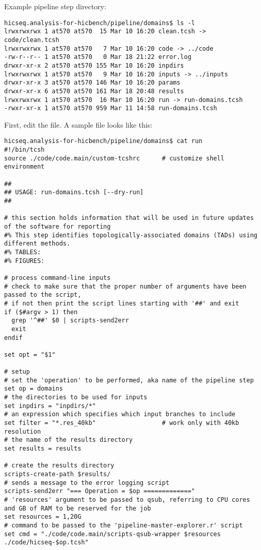 \begin{enumerate}
Example pipeline step directory:
\begin{lstlisting}
hicseq.analysis-for-hicbench/pipeline/domains$ ls -l
lrwxrwxrwx 1 at570 at570  15 Mar 10 16:20 clean.tcsh -> code/clean.tcsh
lrwxrwxrwx 1 at570 at570   7 Mar 10 16:20 code -> ../code
-rw-r--r-- 1 at570 at570   0 Mar 18 21:22 error.log
drwxr-xr-x 2 at570 at570 155 Mar 10 16:20 inpdirs
lrwxrwxrwx 1 at570 at570   9 Mar 10 16:20 inputs -> ../inputs
drwxr-xr-x 3 at570 at570 146 Mar 10 16:20 params
drwxr-xr-x 6 at570 at570 161 Mar 18 20:48 results
lrwxrwxrwx 1 at570 at570  16 Mar 10 16:20 run -> run-domains.tcsh
-rwxr-xr-x 1 at570 at570 959 Mar 11 14:58 run-domains.tcsh
\end{lstlisting}
First, edit the  file. A sample  file looks like this:

\begin{lstlisting}
hicseq.analysis-for-hicbench/pipeline/domains$ cat run
#!/bin/tcsh
source ./code/code.main/custom-tcshrc      # customize shell environment

##
## USAGE: run-domains.tcsh [--dry-run]
##

# this section holds information that will be used in future updates of the software for reporting
#% This step identifies topologically-associated domains (TADs) using different methods.
#% TABLES:
#% FIGURES:

# process command-line inputs
# check to make sure that the proper number of arguments have been passed to the script,
# if not then print the script lines starting with '##' and exit
if ($#argv > 1) then
  grep '^##' $0 | scripts-send2err
  exit
endif

set opt = "$1"

# setup
# set the 'operation' to be performed, aka name of the pipeline step
set op = domains 
# the directories to be used for inputs
set inpdirs = "inpdirs/*" 
# an expression which specifies which input branches to include
set filter = "*.res_40kb"                  # work only with 40kb resolution 
# the name of the results directory
set results = results 

# create the results directory
scripts-create-path $results/ 
# sends a message to the error logging script
scripts-send2err "=== Operation = $op =============" 
# 'resources' argument to be passed to qsub, referring to CPU cores and GB of RAM to be reserved for the job
set resources = 1,20G 
# command to be passed to the 'pipeline-master-explorer.r' script
set cmd = "./code/code.main/scripts-qsub-wrapper $resources ./code/hicseq-$op.tcsh" 


\end{lstlisting}
\end{enumerate}
